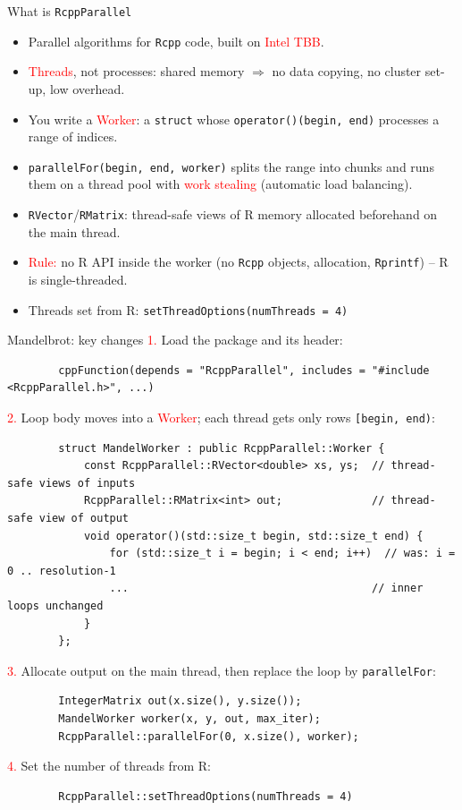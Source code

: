 \documentclass[compress,xcolor=table]{beamer}
\newcommand{\CoG}{\textcolor{red}}
\begin{document}
\begin{frame}{What is {\tt RcppParallel}}
	\small
	\begin{itemize}
		\item Parallel algorithms for {\tt Rcpp} code, built on \CoG{Intel TBB}.
		\item \CoG{Threads}, not processes: shared memory $\Rightarrow$ no data copying, no cluster set-up, low overhead.
		\item You write a \CoG{Worker}: a {\tt struct} whose {\tt operator()(begin, end)} processes a range of indices.
		\item {\tt parallelFor(begin, end, worker)} splits the range into chunks and runs them on a thread pool with \CoG{work stealing} (automatic load balancing).
		\item {\tt RVector}/{\tt RMatrix}: thread-safe views of R memory allocated beforehand on the main thread.
		\item \CoG{Rule:} no R API inside the worker (no {\tt Rcpp} objects, allocation, {\tt Rprintf}) -- R is single-threaded.
		\item Threads set from R: {\tt setThreadOptions(numThreads = 4)}
	\end{itemize}
\end{frame}


\begin{frame}[fragile]{Mandelbrot: key changes}
	\vspace{-0.6em}\footnotesize
	\CoG{1.} Load the package and its header:
	\tiny
	\begin{verbatim}
		cppFunction(depends = "RcppParallel", includes = "#include <RcppParallel.h>", ...)
	\end{verbatim}
	\vspace{-0.6em}\footnotesize
	\CoG{2.} Loop body moves into a \CoG{Worker}; each thread gets only rows {\tt [begin, end)}:
	\tiny
	\begin{verbatim}
		struct MandelWorker : public RcppParallel::Worker {
			const RcppParallel::RVector<double> xs, ys;  // thread-safe views of inputs
			RcppParallel::RMatrix<int> out;              // thread-safe view of output
			void operator()(std::size_t begin, std::size_t end) {
				for (std::size_t i = begin; i < end; i++)  // was: i = 0 .. resolution-1
				...                                      // inner loops unchanged
			}
		};
	\end{verbatim}
	\vspace{-0.6em}\footnotesize
	\CoG{3.} Allocate output on the main thread, then replace the loop by {\tt parallelFor}:
	\tiny
	\begin{verbatim}
		IntegerMatrix out(x.size(), y.size());
		MandelWorker worker(x, y, out, max_iter);
		RcppParallel::parallelFor(0, x.size(), worker);
	\end{verbatim}
	\vspace{-0.6em}\footnotesize
	\CoG{4.} Set the number of threads from R:
	\tiny
	\begin{verbatim}
		RcppParallel::setThreadOptions(numThreads = 4)
	\end{verbatim}
\end{frame}
\end{document}
